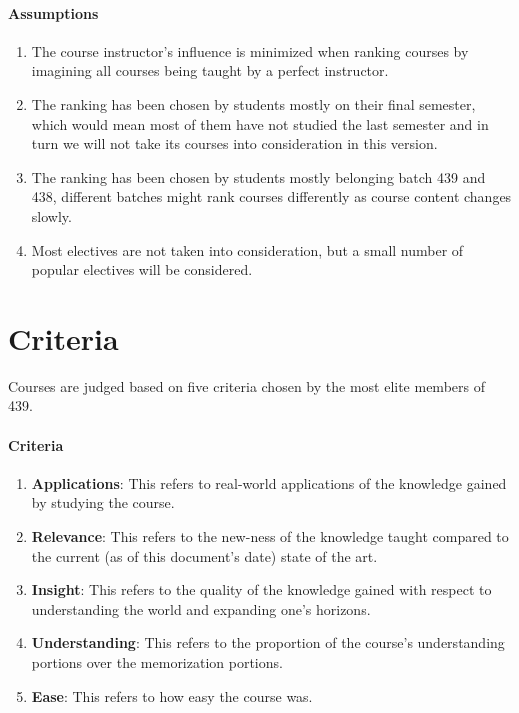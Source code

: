 \documentclass[12pt,a4paper]{article}
\begin{document}
\paragraph{Assumptions}
\begin{enumerate}
    \item The course instructor's influence is minimized when ranking courses by imagining all courses being taught by a perfect instructor.
    \item The ranking has been chosen by students mostly on their final semester, which would mean most of them have not studied the last semester and in turn we will not take its courses into consideration in this version.
    \item The ranking has been chosen by students mostly belonging batch 439 and 438, different batches might rank courses differently as course content changes slowly.
    \item Most electives are not taken into consideration, but a small number of popular electives will be considered. 
\end{enumerate}

\section{Criteria}
Courses are judged based on five criteria chosen by the most elite members of 439.

\paragraph{Criteria}
\begin{enumerate}
    \item \textbf{Applications}: This refers to real-world applications of the knowledge gained by studying the course.
    \item \textbf{Relevance}: This refers to the new-ness of the knowledge taught compared to the current (as of this document's date) state of the art.
    \item \textbf{Insight}: This refers to the quality of the knowledge gained with respect to understanding the world and expanding one's horizons.
    \item \textbf{Understanding}: This refers to the proportion of the course's understanding portions over the memorization portions. 
    \item \textbf{Ease}: This refers to how easy the course was.
\end{enumerate}
\end{document}
